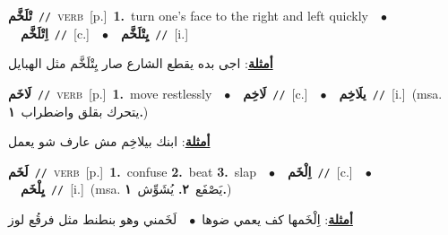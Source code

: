 \documentclass[10pt,a4paper,twoside]{article} %
\begin{document}
\begin{multicols}{2}
{\setlength\topsep{0pt}\textbf{\foreignlanguage{arabic}{تْلَخَّم}}\ {\color{gray}\texttt{//}\color{black}}\ \textsc{verb}\ [p.]\ \textbf{1.}~turn one's face to the right and left quickly\ \ $\bullet$\ \ \setlength\topsep{0pt}\textbf{\foreignlanguage{arabic}{اِتْلَخَّم}}\ {\color{gray}\texttt{//}\color{black}}\ [c.]\ \ $\bullet$\ \ \setlength\topsep{0pt}\textbf{\foreignlanguage{arabic}{يِتْلَخَّم}}\ {\color{gray}\texttt{//}\color{black}}\ [i.]\  \begin{flushright}\color{gray}\foreignlanguage{arabic}{\textbf{\underline{\foreignlanguage{arabic}{أمثلة}}}: اجى بده يقطع الشارع صار يِتْلَخَّم مثل الهبايل}\end{flushright}\color{black}} \vspace{2mm}

{\setlength\topsep{0pt}\textbf{\foreignlanguage{arabic}{لَاخَم}}\ {\color{gray}\texttt{//}\color{black}}\ \textsc{verb}\ [p.]\ \textbf{1.}~move restlessly\ \ $\bullet$\ \ \setlength\topsep{0pt}\textbf{\foreignlanguage{arabic}{لَاخِم}}\ {\color{gray}\texttt{//}\color{black}}\ [c.]\ \ $\bullet$\ \ \setlength\topsep{0pt}\textbf{\foreignlanguage{arabic}{يلَاخِم}}\ {\color{gray}\texttt{//}\color{black}}\ [i.]\ \color{gray}(msa. \foreignlanguage{arabic}{يتحرك بقلق واضطراب}~\foreignlanguage{arabic}{\textbf{١.}})\color{black}\  \begin{flushright}\color{gray}\foreignlanguage{arabic}{\textbf{\underline{\foreignlanguage{arabic}{أمثلة}}}: ابنك بيلاخِم مش عارف شو يعمل}\end{flushright}\color{black}} \vspace{2mm}

{\setlength\topsep{0pt}\textbf{\foreignlanguage{arabic}{لَخَم}}\ {\color{gray}\texttt{//}\color{black}}\ \textsc{verb}\ [p.]\ \textbf{1.}~confuse  \textbf{2.}~beat  \textbf{3.}~slap\ \ $\bullet$\ \ \setlength\topsep{0pt}\textbf{\foreignlanguage{arabic}{اِلْخَم}}\ {\color{gray}\texttt{//}\color{black}}\ [c.]\ \ $\bullet$\ \ \setlength\topsep{0pt}\textbf{\foreignlanguage{arabic}{يِلْخَم}}\ {\color{gray}\texttt{//}\color{black}}\ [i.]\ \color{gray}(msa. \foreignlanguage{arabic}{يَصْفَع}~\foreignlanguage{arabic}{\textbf{٢.}}  \foreignlanguage{arabic}{يُشَوِّش}~\foreignlanguage{arabic}{\textbf{١.}})\color{black}\  \begin{flushright}\color{gray}\foreignlanguage{arabic}{\textbf{\underline{\foreignlanguage{arabic}{أمثلة}}}: اِلْخَمها كف يعمي ضوها\ $\bullet$\ \  لَخَمني وهو بنطنط مثل فرقُع لوز}\end{flushright}\color{black}} \vspace{2mm}


\end{multicols}
\end{document}
